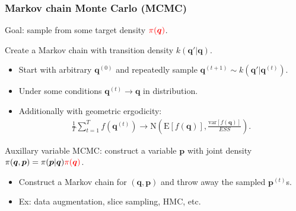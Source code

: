 \documentclass[xcolor=dvipsnames]{beamer}
\begin{document}
\begin{frame}
\frametitle{Markov chain Monte Carlo (MCMC)}
Goal: sample from some target density ${\color{red}\pi(\bm{q})}$.\\

\vspace{0.5cm}

Create a Markov chain with transition density $k(\bm{q}'|\bm{q})$.
\begin{itemize}
\item Start with arbitrary $\bm{q}^{(0)}$ and repeatedly sample $\bm{q}^{(t+1)} \sim k(\bm{q}'|\bm{q}^{(t)})$.\\

\vspace{0.2cm}

\item Under some conditions $\bm{q}^{(t)} \to \bm{q}$ in distribution.

\vspace{0.2cm}

\item Additionally with {\color{red}geometric ergodicity}:
\begin{align*}
  \frac{1}{T}\sum_{t=1}^T f(\bm{q}^{(t)}) \to \mathrm{N}\left(\mathrm{E}[f(\bm{q})], \frac{\mathrm{var}[f(\bm{q})]}{ESS}\right).
\end{align*}
\end{itemize}

\vspace{0.5cm}

Auxillary variable MCMC: construct a variable $\bm{p}$ with joint density $\pi(\bm{q},\bm{p}) = \pi(\bm{p}|\bm{q}){\color{red}\pi(\bm{q})}$.
\begin{itemize}
\item Construct a Markov chain for $(\bm{q}, \bm{p})$ and throw away the sampled $\bm{p}^{(t)}$s.
\vspace{0.2cm}
\item Ex: data augmentation, slice sampling, HMC, etc.
\end{itemize}
\end{frame}
\end{document}
